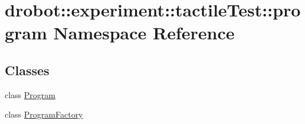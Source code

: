 \hypertarget{namespacedrobot_1_1experiment_1_1tactileTest_1_1program}{\section{drobot\-:\-:experiment\-:\-:tactile\-Test\-:\-:program Namespace Reference}
\label{namespacedrobot_1_1experiment_1_1tactileTest_1_1program}
}
\subsection*{Classes}
\begin{DoxyCompactItemize}
\item 
class \hyperlink{classdrobot_1_1experiment_1_1tactileTest_1_1program_1_1Program}{Program}
\item 
class \hyperlink{classdrobot_1_1experiment_1_1tactileTest_1_1program_1_1ProgramFactory}{Program\-Factory}
\end{DoxyCompactItemize}
